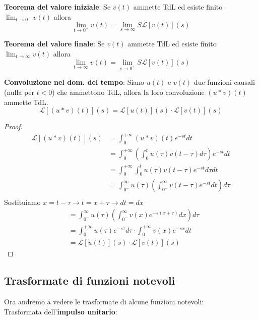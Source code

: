 \documentclass[a4paper]{article}
\begin{document}
\begin{theorem}
    \label{thm:val_iniziale_lap} \textbf{Teorema del valore iniziale}:
    Se $v(t)$ ammette TdL ed esiste finito $\lim_{t \rightarrow 0^-}v(t)$ allora 
    \[\lim_{t \rightarrow 0^-} v(t) = \lim_{s \rightarrow \infty} S\mathcal{L}[v(t)](s)\]
\end{theorem}
\begin{theorem}
    \label{thm:val_finale_lap} \textbf{Teorema del valore finale}:
    Se $v(t)$ ammette TdL ed esiste finito $\lim_{t \rightarrow \infty}v(t)$ allora 
    \[\lim_{t \rightarrow \infty} v(t) = \lim_{s \rightarrow 0^+} S\mathcal{L}[v(t)](s)\]
\end{theorem}
\begin{property}
    \textbf{Convoluzione nel dom. del tempo}: Siano $u(t)$ e $v(t)$ due funzioni causali (nulla per $t<0$) che ammettono TdL, allora la loro convoluzione $(u \ast v)(t)$ ammette TdL. 
    \[\mathcal{L}[(u \ast v)(t)](s) = \mathcal{L}[u(t)](s) \cdot \mathcal{L}[v(t)](s)\]
\end{property}
\begin{proof}
    \begin{align*}
        \mathcal{L}[(u \ast v)(t)](s) &= \int_{0}^{+\infty} (u \ast v)(t)e^{-st}dt\\
        &= \int_{0}^{+\infty} \left(\int_{0}^{t}u(\tau)v(t-\tau)d\tau\right)e^{-st}dt\\
        &= \int_{0}^{+\infty} \int_{0}^{t}u(\tau)v(t-\tau)e^{-st}d\tau dt\\
        &= \int_{0^-}^{\infty} u(\tau)\left(\int_{0^-}^{\infty} v(t-\tau)e^{-st}dt\right)d\tau\\
    \end{align*}
    Sostituiamo $x = t - \tau \rightarrow t = x + \tau \rightarrow dt = dx$ 
    \begin{align*}
        &= \int_{0^-}^{\infty} u(\tau)\left(\int_{0^-}^{\infty} v(x)e^{-s(x+\tau)}dx\right)d\tau\\ 
        &= \int_{0}^{+\infty} u(\tau)e^{-s\tau}d\tau \cdot \int_{0}^{+\infty}v(x)e^{-sx}dt\\
        &= \mathcal{L}[u(t)](s) \cdot \mathcal{L}[v(t)](s)
    \end{align*}
\end{proof}

\subsection{Trasformate di funzioni notevoli}
Ora andremo a vedere le trasformate di alcune funzioni notevoli:\\
Trasformata dell'\textbf{impulso unitario}:
\end{document}
